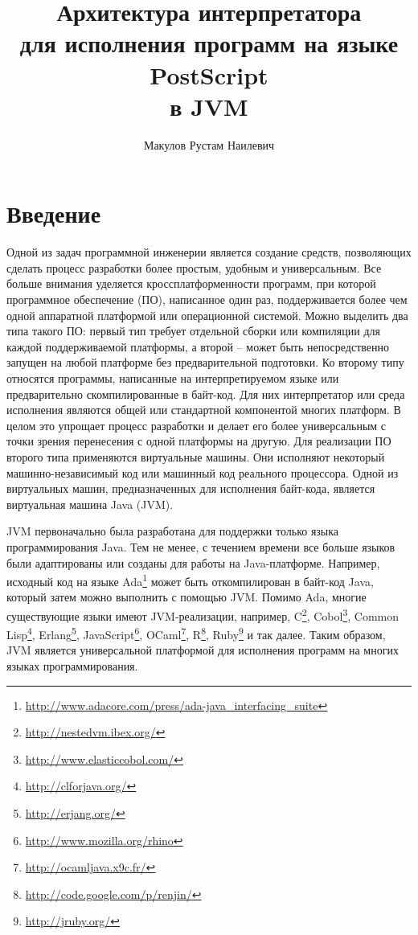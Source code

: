 \title{Архитектура интерпретатора\\ 
для исполнения программ на языке PostScript\\
в JVM}
%
\author{Макулов Рустам Наилевич}
%
%
%

\maketitle              %

\section*{Введение}

Одной из задач программной инженерии является создание средств, позволяющих сделать процесс разработки более простым, удобным и универсальным. Все больше внимания уделяется кроссплатформенности программ, при которой программное обеспечение (ПО), написанное один раз, поддерживается более чем одной аппаратной платформой или операционной системой. Можно выделить два типа такого ПО: первый тип требует отдельной сборки или компиляции для каждой поддерживаемой платформы, а второй – может быть непосредственно запущен на любой платформе без предварительной подготовки. Ко второму типу относятся программы, написанные на интерпретируемом языке или предварительно скомпилированные в байт-код. Для них интерпретатор или среда исполнения являются общей или стандартной компонентой многих платформ. В целом это упрощает процесс разработки и делает его более универсальным с точки зрения перенесения с одной платформы на другую.
Для реализации ПО второго типа применяются виртуальные машины. Они исполняют некоторый машинно-независимый код или машинный код реального процессора. Одной из виртуальных машин, предназначенных для исполнения байт-кода, является виртуальная машина Java (JVM)\cite{jvms}.

JVM первоначально была разработана для поддержки только языка программирования Java. Тем не менее, с течением времени все больше языков были адаптированы или созданы  для работы на Java-платформе. Например, исходный код на языке Ada\footnote{\url{http://www.adacore.com/press/ada-java\_interfacing\_suite}} может быть откомпилирован в байт-код Java, который затем можно выполнить с помощью JVM. Помимо Ada, многие существующие языки имеют JVM-реализации, например, C\footnote{\url{http://nestedvm.ibex.org/}}, Cobol\footnote{\url{http://www.elasticcobol.com/}}, Common Lisp\footnote{\url{http://clforjava.org/}}, Erlang\footnote{\url{http://erjang.org/}}, JavaScript\footnote{\url{http://www.mozilla.org/rhino}}, OCaml\footnote{\url{http://ocamljava.x9c.fr/}}, R\footnote{\url{http://code.google.com/p/renjin/}}, Ruby\footnote{\url{http://jruby.org/}} и так далее. Таким образом, JVM является универсальной платформой для исполнения программ на многих языках программирования. 

